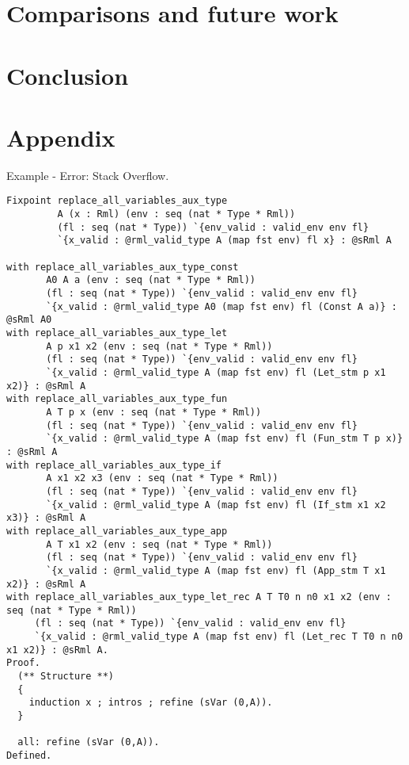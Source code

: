 \documentclass[11pt, leqno]{article}
\begin{document}




\section{Comparisons and future work}


\section{Conclusion}



\newpage
\section{Appendix}
Example - Error: Stack Overflow.
\begin{lstlisting}[language=coq]
Fixpoint replace_all_variables_aux_type
         A (x : Rml) (env : seq (nat * Type * Rml))
         (fl : seq (nat * Type)) `{env_valid : valid_env env fl}
         `{x_valid : @rml_valid_type A (map fst env) fl x} : @sRml A
                                                                            
with replace_all_variables_aux_type_const
       A0 A a (env : seq (nat * Type * Rml))
       (fl : seq (nat * Type)) `{env_valid : valid_env env fl}
       `{x_valid : @rml_valid_type A0 (map fst env) fl (Const A a)} : @sRml A0
with replace_all_variables_aux_type_let
       A p x1 x2 (env : seq (nat * Type * Rml))
       (fl : seq (nat * Type)) `{env_valid : valid_env env fl}
       `{x_valid : @rml_valid_type A (map fst env) fl (Let_stm p x1 x2)} : @sRml A
with replace_all_variables_aux_type_fun
       A T p x (env : seq (nat * Type * Rml))
       (fl : seq (nat * Type)) `{env_valid : valid_env env fl}
       `{x_valid : @rml_valid_type A (map fst env) fl (Fun_stm T p x)} : @sRml A
with replace_all_variables_aux_type_if
       A x1 x2 x3 (env : seq (nat * Type * Rml))
       (fl : seq (nat * Type)) `{env_valid : valid_env env fl}
       `{x_valid : @rml_valid_type A (map fst env) fl (If_stm x1 x2 x3)} : @sRml A
with replace_all_variables_aux_type_app
       A T x1 x2 (env : seq (nat * Type * Rml))
       (fl : seq (nat * Type)) `{env_valid : valid_env env fl}
       `{x_valid : @rml_valid_type A (map fst env) fl (App_stm T x1 x2)} : @sRml A
with replace_all_variables_aux_type_let_rec A T T0 n n0 x1 x2 (env : seq (nat * Type * Rml))
     (fl : seq (nat * Type)) `{env_valid : valid_env env fl}
     `{x_valid : @rml_valid_type A (map fst env) fl (Let_rec T T0 n n0 x1 x2)} : @sRml A.
Proof.
  (** Structure **)
  {
    induction x ; intros ; refine (sVar (0,A)).
  }
  
  all: refine (sVar (0,A)).  
Defined.
\end{lstlisting}
\end{document}
